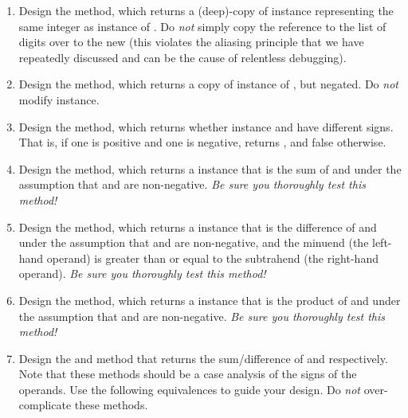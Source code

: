 \begin{enumerate}[label=(\alph*)]
  \item Design the  method, which returns a (deep)-copy of instance representing the same integer as  instance of . Do \emph{not} simply copy the reference to the list of digits over to the new  (this violates the aliasing principle that we have repeatedly discussed and can be the cause of relentless debugging).

  \item Design the  method, which returns a copy of  instance of , but negated. Do \emph{not} modify  instance.
  
  \item Design the  method, which returns whether  instance and  have different signs. That is, if one is positive and one is negative,  returns , and false otherwise.

  \item Design the  method, which returns a  instance that is the sum of  and  under the assumption that  and  are non-negative. \emph{Be sure you thoroughly test this method!}

  \item Design the  method, which returns a  instance that is the difference of  and  under the assumption that  and  are non-negative, and the minuend (the left-hand operand) is greater than or equal to the subtrahend (the right-hand operand). \emph{Be sure you thoroughly test this method!}

  \item Design the  method, which returns a  instance that is the product of  and  under the assumption that  and  are non-negative. \emph{Be sure you thoroughly test this method!}

  \item Design the  and  method that returns the sum/difference of  and  respectively. Note that these methods should be a case analysis of the signs of the operands. Use the following equivalences to guide your design. Do \emph{not} over-complicate these methods.


\end{enumerate}
